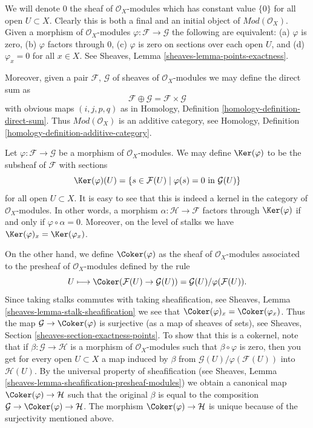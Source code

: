 \medskip\noindent
We will denote $0$ the sheaf of $\mathcal{O}_X$-modules
which has constant value $\{0\}$ for all open $U \subset X$.
Clearly this is both a final and an initial object of
$\textit{Mod}(\mathcal{O}_X)$. Given a morphism
of $\mathcal{O}_X$-modules $\varphi : \mathcal{F} \to \mathcal{G}$
the following are equivalent:
(a) $\varphi$ is zero, (b) $\varphi$ factors through $0$,
(c) $\varphi$ is zero on sections over each open $U$, and
(d) $\varphi_x = 0$ for all $x \in X$. See
Sheaves, Lemma \ref{sheaves-lemma-points-exactness}.

\medskip\noindent
Moreover, given a pair
$\mathcal{F}$, $\mathcal{G}$ of sheaves of $\mathcal{O}_X$-modules
we may define the direct sum as
$$
\mathcal{F} \oplus \mathcal{G} = \mathcal{F} \times \mathcal{G}
$$
with obvious maps $(i, j, p, q)$ as in Homology, Definition
\ref{homology-definition-direct-sum}. Thus $\textit{Mod}(\mathcal{O}_X)$
is an additive category, see
Homology, Definition \ref{homology-definition-additive-category}.

\medskip\noindent
Let $\varphi : \mathcal{F} \to \mathcal{G}$ be a morphism
of $\mathcal{O}_X$-modules. We may define $\Ker(\varphi)$
to be the subsheaf of $\mathcal{F}$ with sections
$$
\Ker(\varphi)(U) =
\{ s \in \mathcal{F}(U) \mid \varphi(s) = 0 \text{ in } \mathcal{G}(U)\}
$$
for all open $U \subset X$. It is easy to see that this is indeed
a kernel in the category of $\mathcal{O}_X$-modules. In other words,
a morphism $\alpha : \mathcal{H} \to \mathcal{F}$ factors
through $\Ker(\varphi)$ if and only if $\varphi \circ \alpha = 0$.
Moreover, on the level of stalks we have
$\Ker(\varphi)_x = \Ker(\varphi_x)$.

\medskip\noindent
On the other hand, we define
$\Coker(\varphi)$ as the sheaf of $\mathcal{O}_X$-modules
associated to the presheaf of $\mathcal{O}_X$-modules defined
by the rule
$$
U
\longmapsto
\Coker(\mathcal{F}(U)\to \mathcal{G}(U)) =
\mathcal{G}(U)/\varphi(\mathcal{F}(U)).
$$
Since taking stalks commutes with taking sheafification, see
Sheaves, Lemma \ref{sheaves-lemma-stalk-sheafification} we
see that $\Coker(\varphi)_x = \Coker(\varphi_x)$.
Thus the map $\mathcal{G} \to \Coker(\varphi)$ is surjective
(as a map of sheaves of sets),
see Sheaves, Section \ref{sheaves-section-exactness-points}.
To show that this is a cokernel, note that if
$\beta : \mathcal{G} \to \mathcal{H}$ is a morphism of $\mathcal{O}_X$-modules
such that $\beta \circ \varphi$ is zero, then you get for every
open $U \subset X$ a map induced by $\beta$ from
$\mathcal{G}(U)/\varphi(\mathcal{F}(U))$ into $\mathcal{H}(U)$.
By the universal property of sheafification (see
Sheaves, Lemma \ref{sheaves-lemma-sheafification-presheaf-modules})
we obtain a canonical map $\Coker(\varphi) \to \mathcal{H}$
such that the original $\beta$ is equal to
the composition
$\mathcal{G} \to \Coker(\varphi) \to \mathcal{H}$.
The morphism $\Coker(\varphi) \to \mathcal{H}$ is unique
because of the surjectivity mentioned above.

